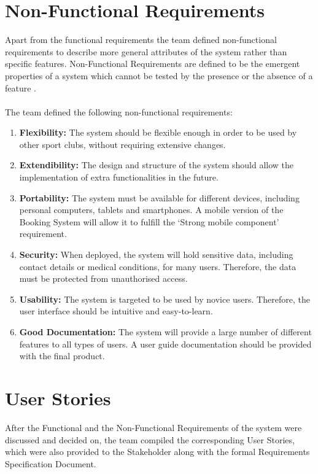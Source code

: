 \documentclass{l3proj}
\begin{document}
\section{Non-Functional Requirements}
\par
Apart from the functional requirements the team defined non-functional requirements to describe more general attributes of the system rather than specific features. Non-Functional Requirements are defined to be the emergent properties of a system which cannot be tested by the presence or the absence of a feature \cite{PSD}. \\
\\
The team defined the following non-functional requirements:
\begin{enumerate}
	\item \textbf{Flexibility:} The system should be flexible enough in order to be used by other sport clubs, without requiring extensive changes.
	\item \textbf{Extendibility:} The design and structure of the system should allow the implementation of extra functionalities in the future.
	\item \textbf{Portability:} The system must be available for different devices, including personal computers, tablets and smartphones. A mobile version of the Booking System will allow it to fulfill the `Strong mobile component' requirement.
	\item \textbf{Security:} When deployed, the system will hold sensitive data, including contact details or medical conditions, for many users. Therefore, the data must be protected from unauthorised access.
	\item \textbf{Usability:} The system is targeted to be used by novice users. Therefore, the user interface should be intuitive and easy-to-learn.
	\item \textbf{Good Documentation:} The system will provide a large number of different features to all types of users. A user guide documentation should be provided with the final product.
\end{enumerate}

\section{User Stories}
\par
After the Functional and the Non-Functional Requirements of the system were discussed and decided on, the team compiled the corresponding User Stories, which were also provided to the Stakeholder along with the formal Requirements Specification Document.
\end{document}
